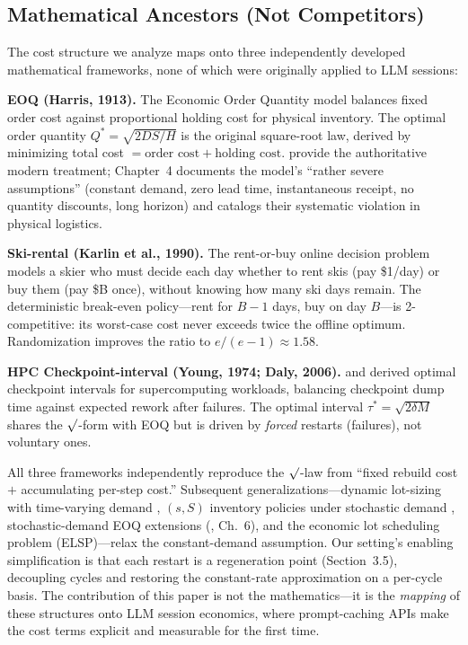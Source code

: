 \documentclass[11pt]{article}
\theoremstyle{definition}
\theoremstyle{remark}
\begin{document}
\subsection{Mathematical Ancestors (Not Competitors)}

The cost structure we analyze maps onto three independently developed mathematical frameworks, none of which were originally applied to LLM sessions:

\textbf{EOQ (Harris, 1913).} The Economic Order Quantity model \citep{harris1913} balances fixed order cost against proportional holding cost for physical inventory. The optimal order quantity $Q^* = \sqrt{2DS/H}$ is the original square-root law, derived by minimizing total cost $= \text{order cost} + \text{holding cost}$. \citet{silver2017} provide the authoritative modern treatment; Chapter~4 documents the model's ``rather severe assumptions'' (constant demand, zero lead time, instantaneous receipt, no quantity discounts, long horizon) and catalogs their systematic violation in physical logistics.

\textbf{Ski-rental (Karlin et al., 1990).} The rent-or-buy online decision problem \citep{karlin1994} models a skier who must decide each day whether to rent skis (pay \$1/day) or buy them (pay \$B once), without knowing how many ski days remain. The deterministic break-even policy---rent for $B-1$ days, buy on day $B$---is 2-competitive: its worst-case cost never exceeds twice the offline optimum. Randomization improves the ratio to $e/(e-1) \approx 1.58$.

\textbf{HPC Checkpoint-interval (Young, 1974; Daly, 2006).} \citet{young1974} and \citet{daly2006} derived optimal checkpoint intervals for supercomputing workloads, balancing checkpoint dump time against expected rework after failures. The optimal interval $\tau^* = \sqrt{2\delta M}$ shares the $\surd$-form with EOQ but is driven by \emph{forced} restarts (failures), not voluntary ones.

All three frameworks independently reproduce the $\surd$-law from ``fixed rebuild cost $+$ accumulating per-step cost.'' Subsequent generalizations---dynamic lot-sizing with time-varying demand \citep{wagner1958}, $(s,S)$ inventory policies under stochastic demand \citep{scarf1960}, stochastic-demand EOQ extensions (\cite{silver2017}, Ch.~6), and the economic lot scheduling problem (ELSP)---relax the constant-demand assumption. Our setting's enabling simplification is that each restart is a regeneration point (Section~3.5), decoupling cycles and restoring the constant-rate approximation on a per-cycle basis. The contribution of this paper is not the mathematics---it is the \emph{mapping} of these structures onto LLM session economics, where prompt-caching APIs make the cost terms explicit and measurable for the first time.
\end{document}
